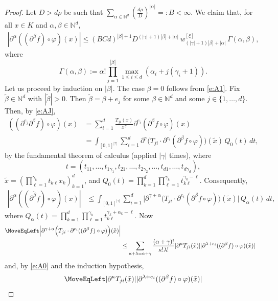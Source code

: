 \documentclass[10pt, reqno]{amsart}
\theoremstyle{plain}
\theoremstyle{definition}
\numberwithin{equation}{section}
\def\al{\alpha}
\def\be{\beta}
\def\ga{\gamma}
\def\ka{\kappa}
\def\la{\lambda}
\def\rh{\rho}
\def\vh{\varphi}
\def\Ga{\Gamma}
\def\N{\mathbb{N}}
\def\p{\partial}
\renewcommand{\o}{\circ}
\begin{document}
\begin{proof}
    Let $D> d\rh$ be such that $\sum_{\al \in \N^d} (\frac{d\rh}{D})^{|\al|} =: B < \infty$.  
    We claim that, 
    for all $x \in K$ and $\al,\be \in \N^d$, 
    \begin{align} \label{e:Aclaim}
        |\p^\al((\p^\be f) \o \vh)(x)| \le (BCd)^{|\be|+1} D^{(|\ga|+1)|\be|+ |\al|}\, w^{[\xi]}_{(|\ga|+1)|\be|+ |\al|}\, \Ga(\al,\be),
    \end{align}
    where 
    \[
        \Ga(\al,\be) := \al! \prod_{j=1}^{|\be|} \max_{1 \le i \le d} (\al_i + j(\ga_i+1)).
    \]
    Let us proceed by induction on $|\be|$.
    The case $\be =0$ follows from \eqref{e:A1}.
    Fix $\tilde \be \in \N^d$ with $|\tilde \be|>0$. 
    Then $\tilde \be = \be + e_j$ for some $\be \in \N^d$ and some $j \in \{1,\ldots,d\}$.
    Then, by \eqref{e:AJ}, 
    \begin{align*}
        ((\p^{e_j}\p^\be f)\o \vh)(x) &= \sum_{i=1}^d \frac{T_{ji}(x)}{x^\ga}  \p^{e_i}(\p^\be f \o \vh)(x)
        \\
                                      &=\int_{[0,1]^{|\ga|}}\sum_{i=1}^d  \p^\ga \Big( T_{ji} \cdot \p^{e_i}(\p^\be f \o \vh)\Big) (\tilde x)\, Q_0(t) \, dt,
    \end{align*}
    by the fundamental theorem of calculus (applied $|\ga|$ times),
    where 
    \[
        t = (t_{11},\ldots,t_{1\ga_1},t_{21},\ldots,t_{2\ga_2},\ldots,t_{d1},\ldots,t_{d\ga_d}),
    \]
    $\tilde x = (\prod_{\ell=1}^{\ga_k} t_{k\ell} x_k)_{k=1}^d$,
    and $Q_0(t) = \prod_{k=1}^d \prod_{\ell=1}^{\ga_k} t_{k\ell}^{\ga_k-\ell}$.
    Consequently, 
    \begin{align*}
        |\p^\al ((\p^{\tilde \be} f) \o \vh)(x)| &\le   \int_{[0,1]^{|\ga|}}\sum_{i=1}^d  \Big|\p^{\ga+ \al} \Big( T_{ji} \cdot \p^{e_i}(\p^\be f \o \vh)\Big) (\tilde x)  \Big|\, Q_\al(t) \, dt,
    \end{align*}
    where $Q_\al(t) = \prod_{k=1}^d \prod_{\ell=1}^{\ga_k} t_{k\ell}^{\ga_k+\al_k-\ell}$. 
    Now
    \begin{align*}
        \MoveEqLeft \Big|\p^{\ga+ \al} \Big( T_{ji} \cdot \p^{e_i}((\p^\be f) \o \vh)\Big) (\tilde x)  \Big| 
        \\
        &\le \sum_{\ka+\la = \al+\ga} \frac{(\al+\ga)!}{\ka!\la!} |\p^\ka T_{ji}(\tilde x)||\p^{\la+e_i}((\p^\be f) \o \vh) (\tilde x)|
    \end{align*}
    and, by \eqref{e:A0} and the induction hypothesis, 
    \begin{align*}
        \MoveEqLeft |\p^\ka T_{ji}(\tilde x)||\p^{\la+e_i}((\p^\be f) \o \vh) (\tilde x)| 

\end{align*}
\end{proof}
\end{document}
